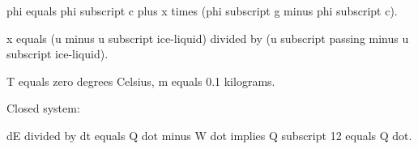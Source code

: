 phi equals phi subscript c plus x times (phi subscript g minus phi subscript c).  

x equals (u minus u subscript ice-liquid) divided by (u subscript passing minus u subscript ice-liquid).  

T equals zero degrees Celsius, m equals 0.1 kilograms.  

Closed system:  

dE divided by dt equals Q dot minus W dot implies Q subscript 12 equals Q dot.